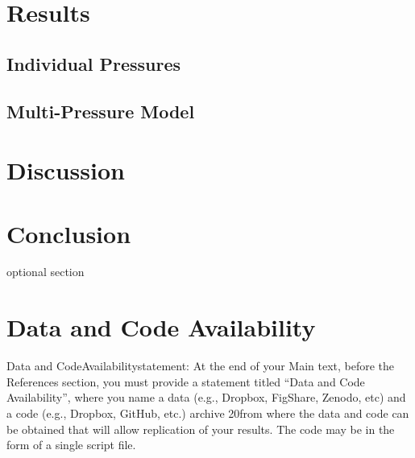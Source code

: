 \documentclass[11pt, a4paper, titlepage]{article}
\begin{document}
	\clearpage

	 \section*{Results}
	 
	 \subsection*{Individual Pressures}
	 
	 
	 \subsection*{Multi-Pressure Model}
	 
	 

    \clearpage
    
     \section*{Discussion}
     
     \clearpage
     
     \section*{Conclusion }
     optional section
     \clearpage
    
    \section*{Data and Code Availability}
    Data  and  CodeAvailabilitystatement:  At  the  end  of  your  Main  text,  before  the  References section, you must provide a statement titled “Data and Code Availability”, where you name a data (e.g., Dropbox, FigShare, Zenodo, etc) and a code (e.g., Dropbox, GitHub, etc.) archive 
    20from where the data and code can be obtained that will allow replication of your results. The code may be in the form of a single script file.
    
    \clearpage
    

    
\end{document}
